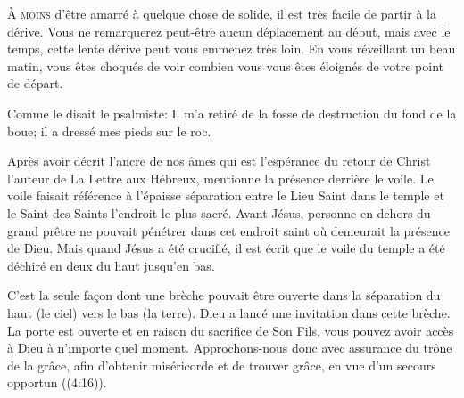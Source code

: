 \lettrine{À}{ moins} d'être amarré à quelque chose de solide,
 il est très facile de partir à la dérive.
 Vous ne remarquerez peut-être aucun déplacement au début,
 mais avec le temps, cette lente dérive peut vous emmenez très loin.
 En vous réveillant un beau matin, vous êtes choqués de voir
 combien vous vous êtes éloignés de votre point de départ. 

Comme le disait le psalmiste: 
 \Og Il m'a retiré de la fosse de destruction du fond de la boue;
 il a dressé mes pieds sur le roc. \Fg{}


Après avoir décrit l'ancre de nos âmes
 \ocadr qui est l'espérance du retour de Christ \fcadr{}
 l'auteur de La Lettre aux Hébreux, mentionne la présence derrière le voile.
 Le voile faisait référence à l'épaisse séparation entre le Lieu Saint
 dans le temple et le Saint des Saints \ocadr l'endroit le plus sacré.
 Avant Jésus, personne en dehors du grand prêtre 
 ne pouvait pénétrer
 dans cet endroit saint où demeurait la présence de Dieu.
 Mais quand Jésus a été crucifié, il est écrit que le voile du temple
 a été déchiré en deux du haut jusqu'en bas.

C'est la seule fa\c{c}on dont une brèche pouvait être ouverte
 dans la séparation \ocadr du haut (le ciel) vers le bas (la terre).
 Dieu a lancé une invitation dans cette brèche. La porte est ouverte
 et en raison du sacrifice de Son Fils, vous pouvez avoir accès à Dieu
 à n'importe quel moment.
 \Og Approchons-nous donc avec assurance du trône de la grâce,
 afin d'obtenir miséricorde et de trouver grâce,
 en vue d'un secours opportun \Fg{} ((4:16)). 

\dvrule







